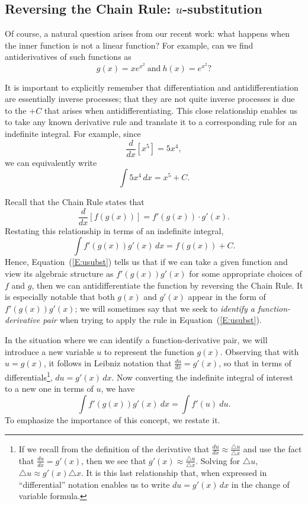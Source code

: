 \subsection*{Reversing the Chain Rule: $u$-substitution} 

Of course, a natural question  arises from our recent work: what happens when the inner function is not a linear function?  For example, can we find antiderivatives of such functions as 
\[ g(x) = x e^{x^2} \ \mbox{and} \ h(x) = e^{x^2}? \]

It is important to explicitly remember that differentiation and antidifferentiation are essentially inverse processes; that they are not quite inverse processes is due to the $+C$ that arises when antidifferentiating.  This close relationship enables us to take any known derivative rule and translate it to a corresponding rule for an indefinite integral.  For example, since
\[ \frac{d}{dx} \left[x^5\right] = 5x^4, \]
we can equivalently write
\[ \int 5x^4 \, dx = x^5 + C. \]

Recall that the Chain Rule states that
\[ \frac{d}{dx} \left[ f(g(x)) \right] = f'(g(x)) \cdot g'(x). \]
Restating this relationship in terms of an indefinite integral,
\begin{equation} \label{E:usubst} %
\int f'(g(x)) g'(x) \, dx = f(g(x))+C.
\end{equation}
Hence, Equation~(\ref{E:usubst}) tells us that if we can take a given function and view its algebraic structure as $f'(g(x)) g'(x)$ for some appropriate choices of $f$ and $g$, then we can antidifferentiate the function by reversing the Chain Rule.  It is especially notable that both $g(x)$ and $g'(x)$ appear in the form of $f'(g(x)) g'(x)$; we will sometimes say that we seek to \emph{identify a function-derivative pair} when trying to apply the rule in Equation~(\ref{E:usubst}).

In the situation where we can identify a function-derivative pair, we will introduce a new variable $u$ to represent the function $g(x)$.  Observing that with $u = g(x)$, it follows in Leibniz notation that $\frac{du}{dx} = g'(x)$, so that in terms of differentials\footnote{If we recall from the definition of the derivative that $\frac{du}{dx} \approx \frac{\triangle{u}}{\triangle{x}}$ and use the fact that $\frac{du}{dx} = g'(x)$, then we see that $g'(x) \approx \frac{\triangle{u}}{\triangle{x}}$.  Solving for $\triangle u$, $\triangle u \approx g'(x) \triangle x$.  It is this last relationship that, when expressed in ``differential'' notation enables us to write $du = g'(x) \, dx$ in the change of variable formula.}, $du = g'(x)\, dx$.  Now converting the indefinite integral of interest to a new one in terms of $u$, we have  
\[ \int f'(g(x)) g'(x) \ dx = \int f'(u) \ du. \]
To emphasize the importance of this concept, we restate it.
 
